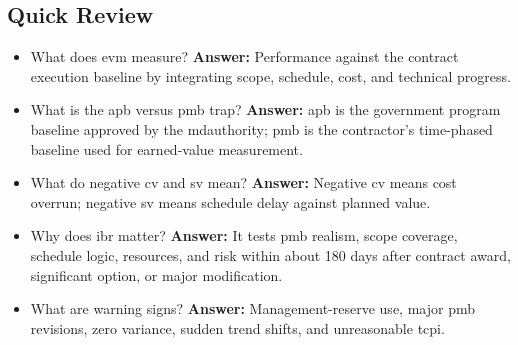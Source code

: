 \documentclass[../main.tex]{subfiles}
\begin{document}
\subsection{Quick Review}
\begin{itemize}
  \item What does \ac{evm} measure? \textbf{Answer:} Performance against the contract execution baseline by integrating
  scope, schedule, cost, and technical progress.
  \item What is the \ac{apb} versus \ac{pmb} trap? \textbf{Answer:} \ac{apb} is the government program baseline approved
  by the \ac{mdauthority}; \ac{pmb} is the contractor's time-phased baseline used for earned-value measurement.
  \item What do negative \ac{cv} and \ac{sv} mean? \textbf{Answer:} Negative \ac{cv} means cost overrun; negative
  \ac{sv} means schedule delay against planned value.
  \item Why does \ac{ibr} matter? \textbf{Answer:} It tests \ac{pmb} realism, scope coverage, schedule logic, resources,
  and risk within about 180 days after contract award, significant option, or major modification.
  \item What are warning signs? \textbf{Answer:} Management-reserve use, major \ac{pmb} revisions, zero variance, sudden
  trend shifts, and unreasonable \ac{tcpi}.
\end{itemize}

\end{document}
